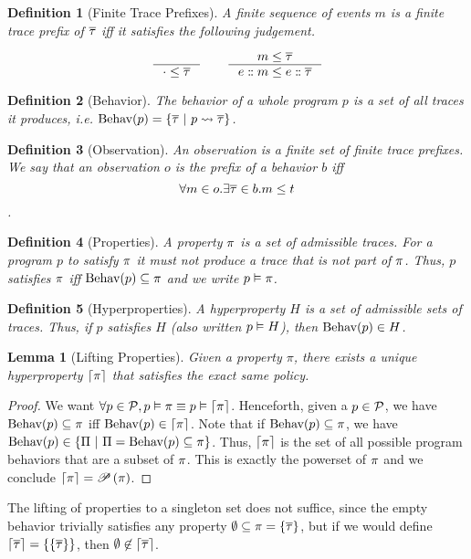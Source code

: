 \documentclass[a4paper,names,dvipsnames]{article}
\newtheorem{definition}{Definition}
\newtheorem{lemma}{Lemma}
\begin{document}
\begin{definition}[Finite Trace Prefixes]
  A finite sequence of events $m$ is a finite trace prefix of $\overline{\tau}$ iff it satisfies the following judgement.

  $$
    \inference{}{\cdot\le\trace}\hspace{2em}\inference{m\le\trace}{\seqcons{e}{m}\le \seqcons{e}{\trace}}
  $$
\end{definition}

\begin{definition}[Behavior]
  The behavior of a whole program $p$ is a set of all traces it produces, i.e. $\behav{p}=\{\trace\ |\ \mktrace{p}{\trace}\}$.
\end{definition}

\begin{definition}[Observation]
  An observation is a finite set of finite trace prefixes.
  We say that an observation $o$ is the prefix of a behavior $b$ iff $$\forall m\in o.\exists \overline{\tau}\in b.m\le t$$.
\end{definition}

\begin{definition}[Properties]
  A property $\pi$ is a set of admissible traces. For a program $p$ to satisfy $\pi$ it must not produce a trace that is not part of $\pi$. Thus, $p$ satisfies $\pi$ iff $\text{Behav}({p})\subseteq\pi$ and we write ${p}\vDash{\pi}$.
\end{definition}

\begin{definition}[Hyperproperties]
  A hyperproperty $H$ is a set of admissible sets of traces. Thus, if $p$ satisfies $H$ (also written ${p}\vDash{H}$), then $\text{Behav}({p})\in H$.
\end{definition}

\begin{lemma}[Lifting Properties]
  Given a property $\pi$, there exists a unique hyperproperty $\left\lceil{\pi}\right\rceil$ that satisfies the exact same policy.
\end{lemma}
\begin{proof}
  We want $\forall p \in\mathcal{P}, {p}\vDash{\pi}\equiv{p}\vDash{\left\lceil{\pi}\right\rceil}$.
  Henceforth, given a $p\in\mathcal{P}$, we have $\text{Behav}({p})\subseteq\pi$ iff $\text{Behav}({p})\in\left\lceil{\pi}\right\rceil$.
  Note that if $\text{Behav}({p})\subseteq\pi$, we have $\behav{p}\in\left\{\Pi\ |\ \Pi=\behav{p}\subseteq\prop\right\}$.
  Thus, $\left\lceil{\pi}\right\rceil$ is the set of all possible program behaviors that are a subset of $\pi$.
  This is exactly the powerset of $\pi$ and we conclude $\left\lceil{\pi}\right\rceil=\mathscr{P}\left({\pi}\right)$.
\end{proof}
\noindent
The lifting of properties to a singleton set does not suffice, since the empty behavior trivially satisfies any property $\emptyset\subseteq\pi=\{\overline{\tau}\}$, but if we would define $\left\lceil{\overline{\tau}}\right\rceil=\{\{\overline{\tau}\}\}$, then $\emptyset\not\in\left\lceil{\overline{\tau}}\right\rceil$.
\end{document}
